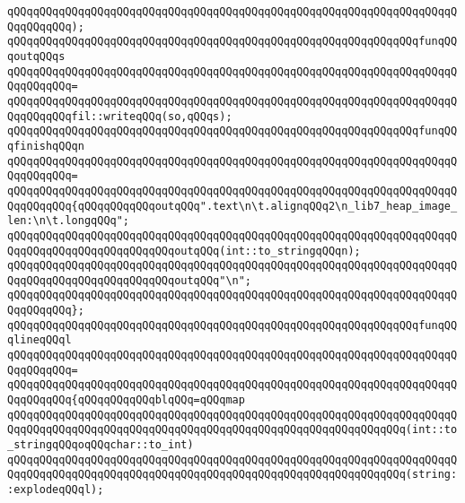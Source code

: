 \verb|qQQqqQQqqQQqqQQqqQQqqQQqqQQqqQQqqQQqqQQqqQQqqQQqqQQqqQQqqQQqqQQqqQQqqQQqqQQqqQQq);|\newline
\newline
\verb|qQQqqQQqqQQqqQQqqQQqqQQqqQQqqQQqqQQqqQQqqQQqqQQqqQQqqQQqqQQqqQQqfunqQQqoutqQQqs|\newline
\verb|qQQqqQQqqQQqqQQqqQQqqQQqqQQqqQQqqQQqqQQqqQQqqQQqqQQqqQQqqQQqqQQqqQQqqQQqqQQqqQQq=|\newline
\verb|qQQqqQQqqQQqqQQqqQQqqQQqqQQqqQQqqQQqqQQqqQQqqQQqqQQqqQQqqQQqqQQqqQQqqQQqqQQqqQQqfil::writeqQQq(so,qQQqs);|\newline
\newline
\verb|qQQqqQQqqQQqqQQqqQQqqQQqqQQqqQQqqQQqqQQqqQQqqQQqqQQqqQQqqQQqqQQqfunqQQqfinishqQQqn|\newline
\verb|qQQqqQQqqQQqqQQqqQQqqQQqqQQqqQQqqQQqqQQqqQQqqQQqqQQqqQQqqQQqqQQqqQQqqQQqqQQqqQQq=|\newline
\verb|qQQqqQQqqQQqqQQqqQQqqQQqqQQqqQQqqQQqqQQqqQQqqQQqqQQqqQQqqQQqqQQqqQQqqQQqqQQqqQQq{qQQqqQQqqQQqoutqQQq".text\n\t.alignqQQq2\n_lib7_heap_image_len:\n\t.longqQQq";|\newline
\verb|qQQqqQQqqQQqqQQqqQQqqQQqqQQqqQQqqQQqqQQqqQQqqQQqqQQqqQQqqQQqqQQqqQQqqQQqqQQqqQQqqQQqqQQqqQQqqQQqoutqQQq(int::to_stringqQQqn);|\newline
\verb|qQQqqQQqqQQqqQQqqQQqqQQqqQQqqQQqqQQqqQQqqQQqqQQqqQQqqQQqqQQqqQQqqQQqqQQqqQQqqQQqqQQqqQQqqQQqqQQqoutqQQq"\n";|\newline
\verb|qQQqqQQqqQQqqQQqqQQqqQQqqQQqqQQqqQQqqQQqqQQqqQQqqQQqqQQqqQQqqQQqqQQqqQQqqQQqqQQq};|\newline
\newline
\verb|qQQqqQQqqQQqqQQqqQQqqQQqqQQqqQQqqQQqqQQqqQQqqQQqqQQqqQQqqQQqqQQqfunqQQqlineqQQql|\newline
\verb|qQQqqQQqqQQqqQQqqQQqqQQqqQQqqQQqqQQqqQQqqQQqqQQqqQQqqQQqqQQqqQQqqQQqqQQqqQQqqQQq=|\newline
\verb|qQQqqQQqqQQqqQQqqQQqqQQqqQQqqQQqqQQqqQQqqQQqqQQqqQQqqQQqqQQqqQQqqQQqqQQqqQQqqQQq{qQQqqQQqqQQqblqQQq=qQQqmap|\newline
\verb|qQQqqQQqqQQqqQQqqQQqqQQqqQQqqQQqqQQqqQQqqQQqqQQqqQQqqQQqqQQqqQQqqQQqqQQqqQQqqQQqqQQqqQQqqQQqqQQqqQQqqQQqqQQqqQQqqQQqqQQqqQQqqQQqqQQq(int::to_stringqQQqoqQQqchar::to_int)|\newline
\verb|qQQqqQQqqQQqqQQqqQQqqQQqqQQqqQQqqQQqqQQqqQQqqQQqqQQqqQQqqQQqqQQqqQQqqQQqqQQqqQQqqQQqqQQqqQQqqQQqqQQqqQQqqQQqqQQqqQQqqQQqqQQqqQQqqQQq(string::explodeqQQql);|\newline
\newline
